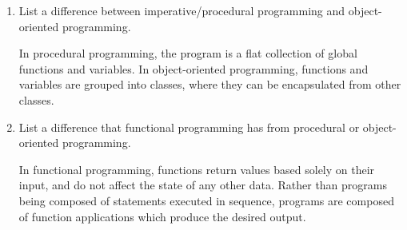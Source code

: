 \begin{enumerate}

\item List a difference between imperative/procedural programming and object-oriented programming.

\begin{answer}
In procedural programming, the program is a flat collection of global functions and variables. In object-oriented programming, functions and variables are grouped into classes, where they can be encapsulated from other classes.
\end{answer}


\item List a difference that functional programming has from procedural or object-oriented programming.

\begin{answer}
In functional programming, functions return values based solely on their input, and do not affect the state of any other data. Rather than programs being composed of statements executed in sequence, programs are composed of function applications which produce the desired output.
\end{answer}

\end{enumerate}
